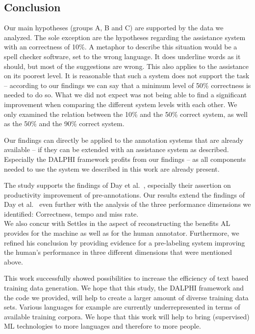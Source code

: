 	\subsection{Conclusion}
		Our main hypotheses (groups A, B and C) are supported by the data we analyzed. The sole exception are the hypotheses regarding the assistance system with an correctness of 10\%. A metaphor to describe this situation would be a spell checker software, set to the wrong language. It does underline words as it should, but most of the suggestions are wrong. This also applies to the assistance on its poorest level. It is reasonable that such a system does not support the task -- according to our findings we can say that a minimum level of 50\% correctness is needed to do so. What we did not expect was not being able to find a significant improvement when comparing the different system levels with each other. We only examined the relation between the 10\% and the 50\% correct system, as well as the 50\% and the 90\% correct system.

		Our findings can directly be applied to the annotation systems that are already available -- if they can be extended with an assistance system as described. Especially the \ac{DALPHI} framework profits from our findings -- as all components needed to use the system we described in this work are already present.

		The study supports the findings of Day et al.~\cite{day1997mixed}, especially their assertion on productivity improvement of pre-annotations. Our results extend the findings of Day et al.~\cite{day1997mixed} even further with the analysis of the three performance dimensions we identified: Correctness, tempo and miss rate.\\
		We also concur with Settles \cite{settles2011closing} in the aspect of reconstructing the benefits \ac{AL} provides for the machine as well as for the human annotator. Furthermore, we refined his conclusion by providing evidence for a pre-labeling system improving the human's performance in three different dimensions that were mentioned above.

		This work successfully showed possibilities to increase the efficiency of text based training data generation. We hope that this study, the \ac{DALPHI} framework and the code we provided, will help to create a larger amount of diverse training data sets. Various languages for example are currently underrepresented in terms of available training corpora. We hope that this work will help to bring (supervised) \ac{ML} technologies to more languages and therefore to more people.


